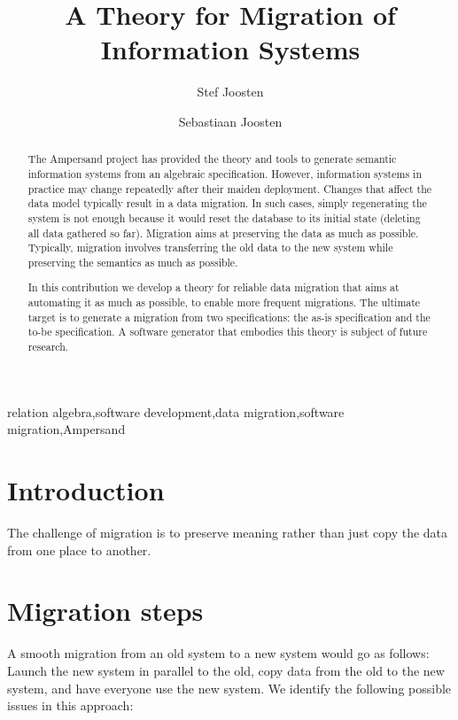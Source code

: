 \documentclass{elsarticle}
\begin{document}


\title{A Theory for Migration of Information Systems}
\author[ou,ordina]{Stef Joosten}
\author[umn]{Sebastiaan Joosten}
\address[ou]{Open Universiteit Nederland, Heerlen, the Netherlands}
\address[ordina]{Ordina NV, Nieuwegein, the Netherlands}
\address[umn]{University of Minnesota, Minneapolis, USA}

\begin{abstract}
	The Ampersand project has provided the theory and tools to generate semantic information systems from an algebraic specification.
	However, information systems in practice may change repeatedly after their maiden deployment.
	Changes that affect the data model typically result in a data migration.
	In such cases, simply regenerating the system is not enough because it would reset the database to its initial state (deleting all data gathered so far).
	Migration aims at preserving the data as much as possible.
	Typically, migration involves transferring the old data to the new system while preserving the semantics as much as possible.

	In this contribution we develop a theory for reliable data migration that aims at automating it as much as possible,
	to enable more frequent migrations.
	The ultimate target is to generate a migration from two specifications: the as-is specification and the to-be specification.
	A software generator that embodies this theory is subject of future research.
\end{abstract}

\begin{keyword}
relation algebra\sep software development\sep data migration\sep software migration\sep Ampersand
\end{keyword}
\maketitle

\section{Introduction}
\label{sct:Introduction}
	The challenge of migration is to preserve meaning rather than just copy the data from one place to another.

\section{Migration steps}
	A smooth migration from an old system to a new system would go as follows:
	Launch the new system in parallel to the old, copy data from the old to the new system, and have everyone use the new system.
	We identify the following possible issues in this approach:
\end{document}
